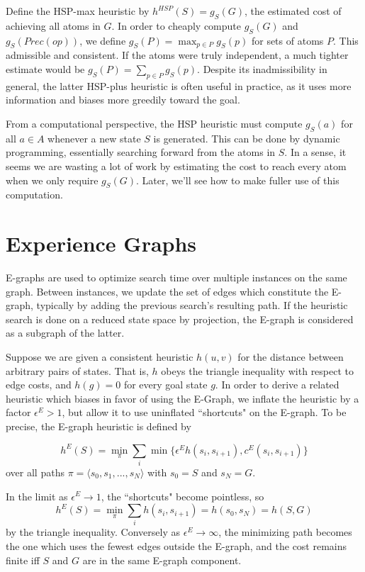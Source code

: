 \documentclass[letterpaper]{article}
\begin{document}
Define the HSP-max heuristic by $h^{HSP}(S) = g_S(G)$, the estimated cost of achieving all atoms in $G$. In order to cheaply compute $g_S(G)$ and $g_S(Prec(op))$, we define $g_S(P) = \max_{p\in P} g_S(p)$ for sets of atoms $P$. This admissible and consistent. If the atoms were truly independent, a much tighter estimate would be $g_S(P) = \sum_{p\in P} g_S(p)$. Despite its inadmissibility in general, the latter HSP-plus heuristic is often useful in practice, as it uses more information and biases more greedily toward the goal.

From a computational perspective, the HSP heuristic must compute $g_S(a)$ for all $a\in A$ whenever a new state $S$ is generated. This can be done by dynamic programming, essentially searching forward from the atoms in $S$. In a sense, it seems we are wasting a lot of work by estimating the cost to reach every atom when we only require $g_S(G)$. Later, we'll see how to make fuller use of this computation.

\section{Experience Graphs}

E-graphs are used to optimize search time over multiple instances on the same graph.
Between instances, we update the set of edges which constitute the E-graph, typically by adding the previous search's resulting path.
If the heuristic search is done on a reduced state space by projection, the E-graph is considered as a subgraph of the latter.

Suppose we are given a consistent heuristic $h(u,v)$ for the distance between arbitrary pairs of states. That is, $h$ obeys the triangle inequality with respect to edge costs, and $h(g) = 0$ for every goal state $g$. In order to derive a related heuristic which biases in favor of using the E-Graph, we inflate the heuristic by a factor $\epsilon^E > 1$, but allow it to use uninflated ``shortcuts" on the E-graph. To be precise, the E-graph heuristic is defined by

\[h^E(S) = \min_\pi \sum_i \min \{\epsilon^E h(s_i,s_{i+1}),c^E(s_i,s_{i+1})\}\]
over all paths $\pi = \langle s_0,s_1,...,s_N \rangle$ with $s_0 = S$ and $s_N = G$.

In the limit as $\epsilon^E \rightarrow 1$, the ``shortcuts" become pointless, so \[h^E(S) = \min_\pi \sum_i h(s_i,s_{i+1}) = h(s_0,s_N) = h(S,G)\]
by the triangle inequality. Conversely as $\epsilon^E \rightarrow\infty$, the minimizing path becomes the one which uses the fewest edges outside the E-graph, and the cost remains finite iff $S$ and $G$ are in the same E-graph component.
\end{document}

